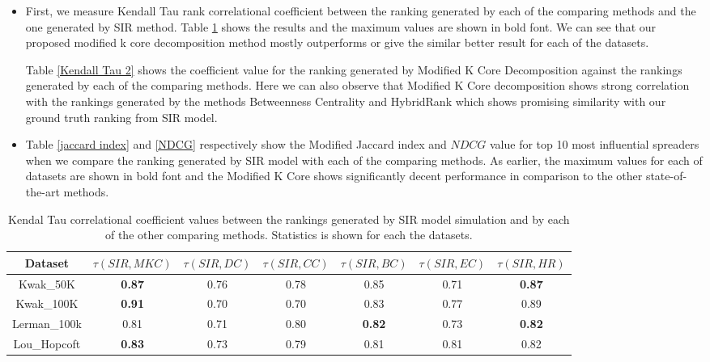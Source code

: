 \documentclass[sigconf]{acmart}
\begin{document}
\begin{itemize}
	\item First, we measure Kendall Tau rank correlational coefficient between the ranking generated by each of the comparing methods and the one generated by SIR method. Table \ref{Kendall Tau 1} shows the results and the maximum values are shown in bold font. We can see that our proposed modified k core decomposition method mostly outperforms or give the similar better result for each of the datasets. 
	
	Table \ref{Kendall Tau 2} shows the coefficient value for the ranking generated by Modified K Core Decomposition against the rankings generated by each of the comparing methods. Here we can also observe that Modified K Core decomposition shows strong correlation with the rankings generated by the methods Betweenness Centrality and HybridRank which shows promising similarity with our ground truth ranking from SIR model. 
	
	\item Table \ref{jaccard index} and \ref{NDCG} respectively show the Modified Jaccard index and $NDCG$ value for top 10 most influential spreaders when we compare the ranking generated by SIR model with each of the comparing methods. As earlier, the maximum values for each of datasets are shown in bold font and the Modified K Core shows significantly decent performance in comparison to the other state-of-the-art methods.
\end{itemize}




\begin{table}
	\caption{Kendal Tau correlational coefficient values between the rankings generated by SIR model simulation and by each of the other comparing methods. Statistics is shown for each the datasets.}
	\begin{adjustbox}{width={ .7\textwidth},totalheight={\textheight},keepaspectratio}%
	\begin{tabular}{|c|c|c|c|c|c|c|}
		\toprule
		Dataset &$\tau(SIR,MKC)$  &$\tau(SIR,DC)$ &$\tau(SIR,CC)$ &$\tau(SIR,BC)$ &$\tau(SIR,EC)$ &$\tau(SIR,HR)$\\
		\midrule
		Kwak\_50K & \textbf{0.87} & 0.76 & 0.78 & 0.85 & 0.71 & \textbf{0.87} \\
		\hline
		Kwak\_100K & \textbf{0.91} & 0.70 & 0.70 & 0.83 & 0.77 & 0.89 \\
		\hline
		Lerman\_100k& 0.81 & 0.71 & 0.80 & \textbf{0.82} & 0.73 & \textbf{0.82} \\
		\hline
		Lou\_Hopcoft& \textbf{0.83} & 0.73 & 0.79 & 0.81 & 0.81 & 0.82 \\
		\bottomrule
	\end{tabular}
	\label{Kendall Tau 1}
	\end{adjustbox}
\end{table} 
\end{document}

